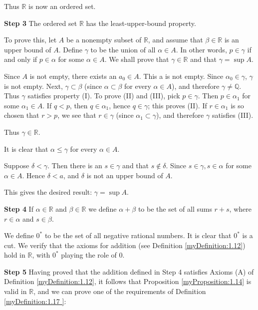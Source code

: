 Thus $\mathbb{R}$ is now an ordered set.


\textbf{Step 3}
The ordered set $\mathbb{R}$ has the least-upper-bound property.

To prove this, let $A$ be a nonempty subset of $\mathbb{R}$, and assume that $\beta \in \mathbb{R}$ is an upper bound of $A$. Define $\gamma$ to be the union of all $\alpha \in A$. In other words, $p\in \gamma$ if and only if $p \in \alpha$ for some $\alpha \in A$. We shall prove that $\gamma \in \mathbb{R}$ and that $\gamma = \sup A$.

Since $A$ is not empty, there exists an $a_0 \in A$. This a is not empty. Since $\alpha_0 \in \gamma$, $\gamma$ is not empty. Next, $\gamma \subset \beta$ (since $\alpha \subset \beta$ for every $\alpha \in A$), and therefore $\gamma \neq \mathbb{Q}$. Thus $\gamma$ satisfies property (I). To prove (II) and (III), pick $p \in \gamma$. Then $p \in \alpha_1$ for some $\alpha_1 \in A$. If $q <p$, then $q \in \alpha_1$, hence $q \in \gamma$; this proves (II). If $r \in \alpha_1$ is so chosen that $r > p$, we see that $r\in \gamma$ (since $\alpha_1 \subset \gamma$), and therefore $\gamma$
satisfies (III).

Thus $\gamma \in \mathbb{R}$.

It is clear that $\alpha \leq \gamma$ for every $\alpha \in A$.

Suppose $\delta < \gamma$. Then there is an $s \in \gamma$ and that $s \not\in \delta$. Since $s \in \gamma, s \in \alpha$
for some $\alpha \in A$. Hence $\delta <a$, and $\delta$ is not an upper bound of $A$.

This gives the desired result: $\gamma = \sup A$.


\textbf{Step 4} If $\alpha \in \mathbb{R}$ and $\beta \in \mathbb{R}$ we define $\alpha + \beta$ to be the set of all sums $r + s$, where
$r \in \alpha$ and $s \in \beta$.

We define $0^*$ to be the set of all negative rational numbers. It is clear that $0^*$ is a cut. We verify that the axioms for addition (see Definition \ref{myDefinition:1.12}) hold in
$\mathbb{R}$, with $0^*$ playing the role of $0$.

\textbf{Step 5} Having proved that the addition defined in Step 4 satisfies Axioms (A) of Definition \ref{myDefinition:1.12}, it follows that Proposition \ref{myProposition:1.14} is valid in $\mathbb{R}$, and we can
prove one of the requirements of Definition \ref{myDefinition:1.17
}:

